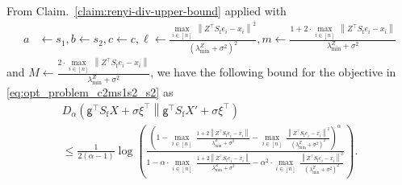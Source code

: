 \documentclass[11pt]{article}
\theoremstyle{definition}
\theoremstyle{plain}
\newcommand{\Norm}[1]{\left\| #1 \right\|}
\providecommand{\norm}[1]{\Norm{#1}}
\providecommand{\KLDA}[2]{{D_{\alpha} \left( #1 \middle\| #2 \right)}}
\begin{document}
From Claim.~\ref{claim:renyi-div-upper-bound} applied with 
\begin{align}
    a&\gets s_1, b\gets s_2, c\gets c, \ell \gets \frac{\underset{i\in[n]}{\max} \ \norm{Z^{\top}S_{\mathrm{f}}e_i - x_i}^2}{\left(\lambda^{Z}_{\min} + \sigma^2\right)^2}, m\gets \frac{1 + 2\cdot \underset{i\in[n]}{\max} \ \norm{Z^{\top}S_{\mathrm{f}}e_i - x_i}}{\lambda^{Z}_{\min} + \sigma^2}
\end{align}
and $M\gets \frac{2\cdot \underset{i\in[n]}{\max} \ \norm{Z^{\top}S_{\mathrm{f}}e_i - x_i}}{\lambda^{Z}_{\min} + \sigma^2}$, we have the following bound for the objective in \eqref{eq:opt_problem_c2ms1s2_s2} as
\begin{multline*}
    \KLDA{\mathsf{g}^{\top}S_{\mathrm{f}}X + \sigma\xi^{\top}}{\mathsf{g}^{\top}S_{\mathrm{f}}X' + \sigma\xi^{\top}} \\ \leq \frac{1}{2(\alpha - 1)}\log\left(\frac{\left(1 - \underset{i\in[n]}{\max} \ \tfrac{1 + 2\norm{Z^{\top}S_{\mathrm{f}}e_i - x_i}}{\lambda^{Z}_{\min} + \sigma^2} - \underset{i\in[n]}{\max} \ \tfrac{\norm{Z^{\top}S_{\mathrm{f}}e_i - x_i}^2}{\left(\lambda^{Z}_{\min} + \sigma^2\right)^2}\right)^{\alpha}}{1 - \alpha\cdot \underset{i\in[n]}{\max} \ \tfrac{1 + 2\norm{Z^{\top}S_{\mathrm{f}}e_i - x_i}}{\lambda^{Z}_{\min} + \sigma^2} -  \alpha^2 \cdot \underset{i\in[n]}{\max} \ \tfrac{\norm{Z^{\top}S_{\mathrm{f}}e_i - x_i}^2}{\left(\lambda^{Z}_{\min} + \sigma^2\right)^2}}\right).
\end{multline*}
\end{document}
